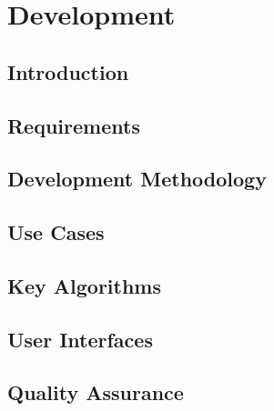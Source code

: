 \chapter{Development}
\section{Introduction}

\section{Requirements}

\section{Development Methodology}

\section{Use Cases}

\section{Key Algorithms}

\section{User Interfaces}

\section{Quality Assurance}

